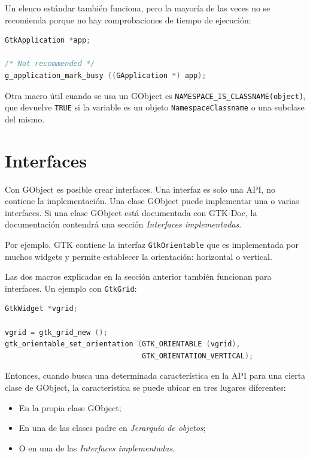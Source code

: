 Un elenco estándar también funciona, pero la mayoría de las veces no se recomienda porque no hay comprobaciones de tiempo de ejecución:

\begin{lstlisting}[language=C]
GtkApplication *app;

/* Not recommended */
g_application_mark_busy ((GApplication *) app);
\end{lstlisting}

Otra macro útil cuando se usa un GObject es \lstinline{NAMESPACE_IS_CLASSNAME(object)}, que devuelve \lstinline{TRUE} si la variable es un objeto \lstinline{NamespaceClassname} o una subclase del mismo.


\section{Interfaces}

Con GObject es posible crear interfaces. Una interfaz es solo una API, no contiene la implementación. Una clase GObject puede implementar una o varias interfaces. Si una clase GObject está documentada con GTK-Doc, la documentación contendrá una sección \emph{Interfaces implementadas}.

Por ejemplo, GTK contiene la interfaz \lstinline{GtkOrientable} que es implementada por muchos widgets y permite establecer la orientación: horizontal o vertical.

Las dos macros explicadas en la sección anterior también funcionan para interfaces. Un ejemplo con \lstinline{GtkGrid}:

\begin{lstlisting}[language=C]
GtkWidget *vgrid;

vgrid = gtk_grid_new ();
gtk_orientable_set_orientation (GTK_ORIENTABLE (vgrid),
                                GTK_ORIENTATION_VERTICAL);
\end{lstlisting}

Entonces, cuando busca una determinada característica en la API para una cierta clase de GObject, la característica se puede ubicar en tres lugares diferentes:
\begin{itemize}
    \item En la propia clase GObject;
    \item En una de las clases padre en \emph{Jerarquía de objetos};
    \item O en una de las \emph{Interfaces implementadas}.
\end{itemize}

